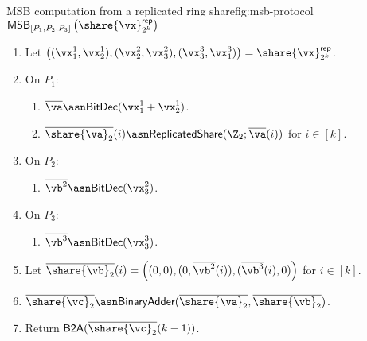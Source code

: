 \begin{Boxfig}{MSB computation from a replicated ring share}{fig:msb-protocol}
  {$\mathsf{MSB}_{[P_1, P_2, P_3]} \left( \share{\vx}^\mathsf{rep}_{2^k} \right)$}
  \begin{enumerate}
  \item Let $\left( (\vx_1^1, \vx_2^1), (\vx_2^2, \vx_3^2), (\vx_3^3, \vx_1^3) \right) = \share{\vx}^{\mathsf{rep}}_{2^k}$.
  
  \item On $P_1$:
  \begin{enumerate}
    \item $\overline{\va} \asn \textsf{BitDec}(\vx^1_1 + \vx^1_2)$.
    \item $\overline{\share{\va}_2}(i) \asn \mathsf{ReplicatedShare}(\Z_2; \overline{\va}(i))$ for $i \in [k]$.
  \end{enumerate}
  
  \item On $P_2$:
  \begin{enumerate}
      \item $\overline{\vb^2} \asn \textsf{BitDec}(\vx_3^2)$.
  \end{enumerate}
  
  \item On $P_3$:
  \begin{enumerate}
      \item $\overline{\vb^3} \asn \textsf{BitDec}(\vx_3^3)$.
  \end{enumerate}
  
  \item Let $\overline{\share{\vb}_2}(i) = \left( (0, 0), (0, \overline{\vb^2}(i)), (\overline{\vb^3}(i), 0) \right)$ for $i \in [k]$.
  
  \item $\overline{\share{\vc}_2} \asn \textsf{BinaryAdder}(\overline{\share{\va}_2}, \overline{\share{\vb}_2})$.
  
  \item Return $\textsf{B2A}(\overline{\share{\vc}_2}(k-1))$.
\end{enumerate}

\end{Boxfig}


